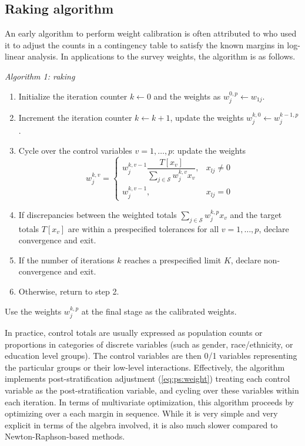 \subsection{Raking algorithm}
\label{subsec:raking:algorithm}

An early algorithm to perform weight calibration is often attributed to
\citet{deming:stephan:1940} who used it to adjust the counts in a contingency
table to satisfy the known margins in log-linear analysis.
In applications to the survey weights, the algorithm is as follows.

{\it Algorithm 1: raking}
\begin{enumerate}
    \item Initialize the iteration counter $k\leftarrow 0$
          and the weights as $w_j^{0,p} \leftarrow w_{1j}$.
    \item Increment the iteration counter $k \leftarrow k+1$,
          update the weights $w_j^{k,0} \leftarrow w_j^{k-1,p}$.
    \item Cycle over the control variables $v=1,\ldots,p$: update the weights
          $$
            w_j^{k,v} =
                \left\{
                \begin{array}{ll}
                    w_j^{k,v-1} \dfrac{ T[x_v] }{ \sum_{j \in \mathcal{S}} w_j^{k,v} x_v },
                        & x_{lj} \neq 0 \\
                    w_j^{k,v-1},
                        & x_{lj} = 0
                \end{array}
                \right.
          $$
    \item If discrepancies between the weighted totals $\sum_{j \in \mathcal{S}} w_j^{k,p} x_v$
          and the target totals $T[x_v]$ are within a prespecified tolerances for all
          $v=1,\ldots,p$, declare convergence and exit.
    \item If the number of iterations $k$ reaches a prespecified limit $K$,
          declare non-convergence and exit.
    \item Otherwise, return to step 2.
\end{enumerate}
Use the weights $w_j^{k,p}$ at the final stage as the calibrated weights.

In practice, control totals are usually expressed as population counts
or proportions in categories of discrete variables (such as gender,
race/ethnicity, or education level groups).
The control variables are then 0/1 variables representing the particular groups
or their low-level interactions.
Effectively, the algorithm implements post-stratification adjustment
(\ref{eq:ps:weight}) treating each control variable as the post-stratification
variable, and cycling over these variables within each iteration. 
In terms of multivariate optimization,
this algorithm proceeds by optimizing over a each margin in sequence.
While it is very simple and very explicit in terms
of the algebra involved, it is also much slower compared
to Newton-Raphson-based methods.

